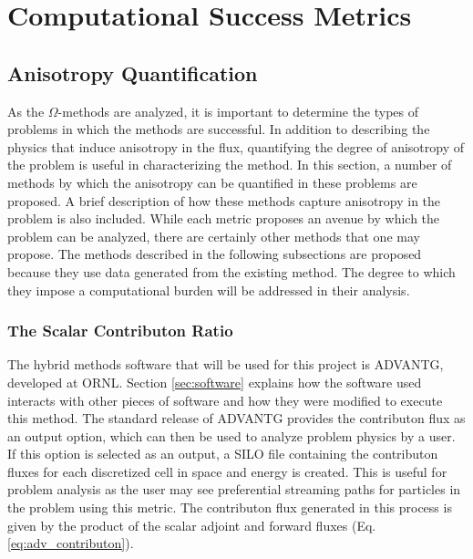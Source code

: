 \newcommand{\anglevars}{x,y,z,E_g,\theta,\varphi}
\newcommand{\scalarvars}{x,y,z,E_g}


\section{Computational Success Metrics}
\label{sec:successmetrics}
\subsection{Anisotropy Quantification}
\label{sec:anisotropy_quant}

As the $\Omega$-methods are analyzed, it is important to determine the
types of problems in which the methods are successful. In addition to describing
the physics that induce anisotropy in the flux, quantifying the degree of
anisotropy of the problem is useful in characterizing the method. In this
section, a number
of methods by which the anisotropy can be quantified in these problems are
proposed. A brief description of how these methods capture anisotropy in the
problem is also included. While each metric proposes an avenue by which the
problem can be analyzed, there are certainly other methods that one may propose.
The methods described in the following
subsections are proposed because they use data generated from the existing
method. The degree to which they impose a computational burden will be addressed
in their analysis.

\subsubsection{The Scalar Contributon Ratio}

The hybrid methods software that will be used for this project is ADVANTG,
developed at ORNL. Section \ref{sec:software} explains how the software used
interacts with other pieces of software
and how they were modified to execute this method.
The standard release of ADVANTG provides the contributon flux as an output
option, which can then be used to analyze problem physics by a user.
If this option is selected as an output, a SILO file containing
the contributon fluxes for each discretized cell in space and energy  is
created. This is useful for problem analysis as the user may see
preferential streaming paths for particles in the problem using this metric.
The contributon flux generated in this process is given by the product
of the scalar adjoint and forward fluxes (Eq. \eqref{eq:adv_contributon}).

